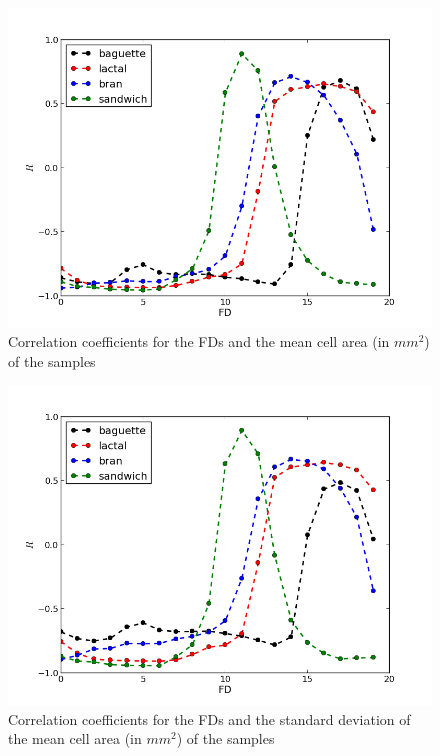 \begin{figure}[htb]
\centering
\includegraphics[scale=0.4]{../images/mca}
\caption{Correlation coefficients for the FDs and the mean cell area (in $mm^{2}$) of the samples}
\label{fig:corrMCA}
\end{figure}

\begin{figure}[htb]
\centering
\includegraphics[scale=0.4]{../images/mcastdev}
\caption{Correlation coefficients for the FDs and the standard deviation of the mean cell area (in $mm^{2}$) of the samples}
\label{fig:corrMCAstdev}
\end{figure}

